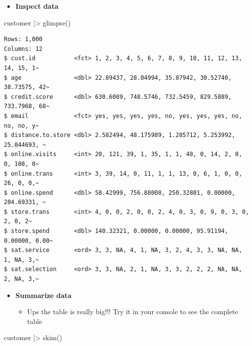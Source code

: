 \documentclass[
  ignorenonframetext,
]{beamer}
\newenvironment{Shaded}{\begin{snugshade}}{\end{snugshade}}
\newcommand{\FunctionTok}[1]{\textcolor[rgb]{0.28,0.35,0.67}{#1}}
\newcommand{\NormalTok}[1]{\textcolor[rgb]{0.00,0.23,0.31}{#1}}
\newcommand{\SpecialCharTok}[1]{\textcolor[rgb]{0.37,0.37,0.37}{#1}}
\providecommand{\tightlist}{%
  \setlength{\itemsep}{0pt}\setlength{\parskip}{0pt}}\usepackage{longtable,booktabs,array}
\begin{document}
\begin{frame}[fragile]{}
\label{section-6}
\begin{itemize}
\tightlist
\item
  \textbf{Inspect data}
\end{itemize}

\tiny

\begin{Shaded}
\begin{Highlighting}[]
\NormalTok{customer }\SpecialCharTok{|\textgreater{}} \FunctionTok{glimpse}\NormalTok{()}
\end{Highlighting}
\end{Shaded}

\begin{verbatim}
Rows: 1,000
Columns: 12
$ cust.id           <fct> 1, 2, 3, 4, 5, 6, 7, 8, 9, 10, 11, 12, 13, 14, 15, 1~
$ age               <dbl> 22.89437, 28.04994, 35.87942, 30.52740, 38.73575, 42~
$ credit.score      <dbl> 630.6089, 748.5746, 732.5459, 829.5889, 733.7968, 68~
$ email             <fct> yes, yes, yes, yes, no, yes, yes, yes, no, no, no, y~
$ distance.to.store <dbl> 2.582494, 48.175989, 1.285712, 5.253992, 25.044693, ~
$ online.visits     <int> 20, 121, 39, 1, 35, 1, 1, 48, 0, 14, 2, 0, 0, 108, 0~
$ online.trans      <int> 3, 39, 14, 0, 11, 1, 1, 13, 0, 6, 1, 0, 0, 26, 0, 0,~
$ online.spend      <dbl> 58.42999, 756.88008, 250.32801, 0.00000, 204.69331, ~
$ store.trans       <int> 4, 0, 0, 2, 0, 0, 2, 4, 0, 3, 0, 9, 0, 3, 0, 2, 0, 2~
$ store.spend       <dbl> 140.32321, 0.00000, 0.00000, 95.91194, 0.00000, 0.00~
$ sat.service       <ord> 3, 3, NA, 4, 1, NA, 3, 2, 4, 3, 3, NA, NA, 1, NA, 3,~
$ sat.selection     <ord> 3, 3, NA, 2, 1, NA, 3, 3, 2, 2, 2, NA, NA, 2, NA, 3,~
\end{verbatim}
\end{frame}

\begin{frame}[fragile]{}
\label{section-7}
\begin{itemize}
\item
  \textbf{Summarize data}

  \begin{itemize}
  \tightlist
  \item
    Ups the table is really big!!! Try it in your console to see the
    complete table
  \end{itemize}
\end{itemize}

\tiny

\begin{Shaded}
\begin{Highlighting}[]
\NormalTok{customer }\SpecialCharTok{|\textgreater{}} \FunctionTok{skim}\NormalTok{()}
\end{Highlighting}
\end{Shaded}
\end{frame}
\end{document}
